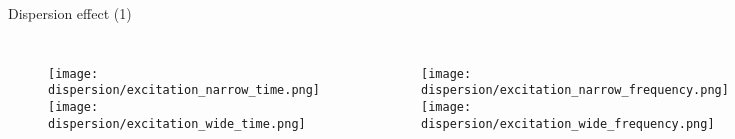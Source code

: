 \documentclass[10pt,aspectratio=169,notes]{beamer} %
\begin{document}
\note{
	
}
\begin{frame}{Dispersion effect (1)}
	\begin{columns}[T]
		\begin{figure}
			\texttt{[image: dispersion/excitation\_narrow\_time.png]}
			\texttt{[image: dispersion/excitation\_wide\_time.png]}
		\end{figure}
		\newcommand{\modelname}{dispersion_effect}
		\begin{figure}
			\texttt{[image: dispersion/excitation\_narrow\_frequency.png]}
			\texttt{[image: dispersion/excitation\_wide\_frequency.png]}
		\end{figure}
	\end{columns}
\end{frame}
\end{document}
